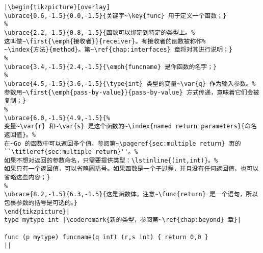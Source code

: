 \begin{lstlisting}[caption=函数定义,label=src:function definition]
|\begin{tikzpicture}[overlay]
\ubrace{0.6,-1.5}{0.0,-1.5}{关键字~\key{func} 用于定义一个函数；}
%
\ubrace{2.2,-1.5}{0.8,-1.5}{函数可以绑定到特定的类型上。%
这叫做~\first{\emph{接收者}}{receiver}。有接收者的函数被称作%
~\index{方法}{method}。第~\ref{chap:interfaces} 章将对其进行说明；}
%
\ubrace{3.4,-1.5}{2.4,-1.5}{\emph{funcname} 是你函数的名字；}
%
\ubrace{4.5,-1.5}{3.6,-1.5}{\type{int} 类型的变量~\var{q} 作为输入参数。%
参数用~\first{\emph{pass-by-value}}{pass-by-value} 方式传递，意味着它们会被复制；}
%
\ubrace{6.0,-1.5}{4.9,-1.5}{%
变量~\var{r} 和~\var{s} 是这个函数的~\index{named return parameters}{命名返回值}。%
在~Go 的函数中可以返回多个值。参阅第~\pageref{sec:multiple return} 页的``\titleref{sec:multiple return}''。%
如果不想对返回的参数命名，只需要提供类型：\lstinline{(int,int)}。%
如果只有一个返回值，可以省略圆括号。如果函数是一个子过程，并且没有任何返回值，也可以省略这些内容；}
%
\ubrace{8.2,-1.5}{6.3,-1.5}{这是函数体。注意~\func{return} 是一个语句，所以包裹参数的括号是可选的。}
\end{tikzpicture}|
type mytype int	|\coderemark{新的类型，参阅第~\ref{chap:beyond} 章}|

func (p mytype) funcname(q int) (r,s int) { return 0,0 }
||
\end{lstlisting}
